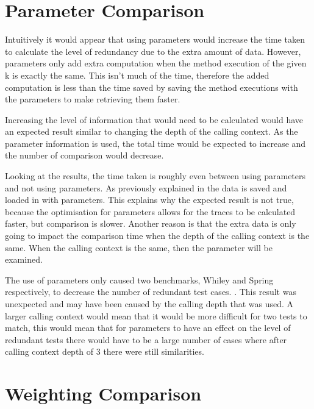 \section{Parameter Comparison}

Intuitively it would appear that using parameters would increase the time taken to calculate the level of redundancy due to the extra amount of data. However, parameters only add extra computation when the method execution of the given k is exactly the same. This isn't much of the time, therefore the added computation is less than the time saved by saving the method executions with the parameters to make retrieving them faster.

Increasing the level of information that would need to be calculated would have an expected result similar to changing the depth of the calling context. As the parameter information is used, the total time would be expected to increase and the number of comparison would decrease.

Looking at the results, the time taken is roughly even between using parameters and not using parameters. As previously explained in  the data is saved and loaded in with parameters. This explains why the expected result is not true, because the optimisation for parameters allows for the traces to be calculated faster, but comparison is slower. Another reason is that the extra data is only going to impact the comparison time when the depth of the calling context is the same. When the calling context is the same, then the parameter will be examined. 

The use of parameters only caused two benchmarks, Whiley and Spring respectively, to decrease the number of redundant test cases.  . This result was unexpected and may have been caused by the calling depth that was used. A larger calling context would mean that it would be more difficult for two tests to match, this would mean that for parameters to have an effect on the level of redundant tests there would have to be a large number of cases where after calling context depth of 3 there were still similarities. 


\section{Weighting Comparison}

